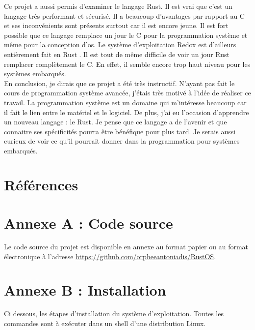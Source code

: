 \documentclass[a4paper, 12pt]{article}
\begin{document}
Ce projet a aussi permis d'examiner le langage Rust. Il est vrai que c'est un
langage très performant et sécurisé. Il a beaucoup d'avantages par rapport
au C et ses inconvénients sont présents surtout car il est encore jeune. Il est
fort possible que ce langage remplace un jour le C pour la programmation système
et même pour la conception d'\acrshort{os}. Le système d'exploitation Redox est
d'ailleurs entièrement fait en Rust \cite{ref31}. Il est tout de même difficile
de voir un jour Rust remplacer complètement le C. En effet, il semble encore trop
haut niveau pour les systèmes embarqués. \\

En conclusion, je dirais que ce projet a été très instructif. N'ayant pas fait le
cours de programmation système avancée, j'étais très motivé à l'idée de réaliser
ce travail. La programmation système est un domaine qui m'intéresse beaucoup
car il fait le lien entre le matériel et le logiciel. De plus, j'ai eu l'occasion
d'apprendre un nouveau langage : le Rust. Je pense que ce langage a de l'avenir
et que connaitre ses spécificités pourra être bénéfique pour plus tard. Je serais
aussi curieux de voir ce qu'il pourrait donner dans la programmation pour systèmes
embarqués.



\newpage
\section*{Références}
\nocite{*}




\newpage
\section*{Annexe A : Code source}
Le code source du projet est disponible en annexe au format papier ou au format
électronique à l'adresse \url{https://github.com/orpheeantoniadis/RustOS}.

\newpage
\section*{Annexe B : Installation}
Ci dessous, les étapes d'installation du système d'exploitation. Toutes les
commandes sont à exécuter dans un shell d'une distribution Linux. \\
\end{document}
